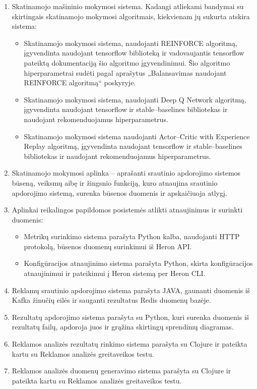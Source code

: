 \documentclass{VUMIFPSbakalaurinis}
\begin{document}
\begin{enumerate}
    \item Skatinamojo mašininio mokymosi sistema. Kadangi atliekami bandymai su skirtingais skatinamojo mokymosi algoritmais, kiekvienam jų sukurta atskira sistema: 
    \begin{itemize}
        \item Skatinamojo mokymosi sistema, naudojanti REINFORCE algoritmą, įgyvendinta naudojant tensorflow biblioteką ir vadovaujantis tensorflow pateiktą dokumentaciją šio algoritmo įgyvendinimui. Šio algoritmo hiperparametrai sudėti pagal aprašytus „Balansavimas naudojant REINFORCE algoritmą“ poskyryje.
        \item Skatinamojo mokymosi sistema, naudojanti Deep Q Network algoritmą, įgyvendinta naudojant tensorflow ir stable–baselines bibliotekas ir naudojant rekomenduojamus hiperparametrus.
        \item Skatinamojo mokymosi sistema naudojanti Actor–Critic with Experience Replay algoritmą, įgyvendinta naudojant tensorflow ir stable–baselines bibliotekas ir naudojant rekomenduojamus hiperparametrus.
    \end{itemize}
    \item Skatinamojo mokymosi aplinka – aprašanti srautinio apdorojimo sistemos būseną, veiksmų aibę ir žingsnio funkciją, kuro atnaujina srautinio apdorojimo sistemą, surenka būsenos duomenis ir apskaičiuoja atlygį. 
    \item Aplinkai reikalingos papildomos posistemės atlikti atnaujinimus ir surinkti duomenis:
    \begin{itemize}
        \item Metrikų surinkimo sistema parašyta Python kalba, naudojanti HTTP protokolą, būsenos duomenų surinkimui iš Heron API.
        \item Konfigūracijos atnaujinimo sistema parašyta Python, skirta konfigūracijos atnaujinimui ir pateikimui į Heron sistemą per Heron CLI.
    \end{itemize}
    \item Reklamų srautinio apdorojimo sistema parašyta JAVA, gaunanti duomenis iš Kafka žinučių eilės ir sauganti rezultatus Redis duomenų bazėje.
    \item Rezultatų apdorojimo sistema parašyta su Python, kuri surenka duomenis iš rezultatų failų, apdoroja juos ir grąžina skirtingų sprendimų diagramas.
    \item Reklamos analizės rezultatų rinkimo sistema parašyta su Clojure ir pateikta kartu su Reklamos analizės greitaveikos testu.
    \item Reklamos analizės duomenų generavimo sistema parašyta su Clojure ir pateikta kartu su Reklamos analizės greitaveikos testu.
\end{enumerate}
\end{document}
